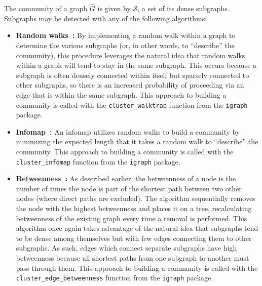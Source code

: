 The community of a graph $\hat{G}$ is given by $\mathcal{S}$, a set of its 
dense subgraphs. Subgraphs may be detected with any of the following algorithms:

\tablespacing
\begin{itemize}
	\item \textbf{Random walks~\cite{igraph}:} 
	By implementing a random walk within a graph 
	to determine the various subgraphs (or, in other words, to ``describe'' the 
	community), this procedure leverages the natural idea 
	that random walks within a graph will tend to stay in the same subgraph. 
	This occurs because a subgraph is often densely connected within itself but 
	sparsely connected to other subgraphs, so there is an increased probability 
	of proceeding via an edge that is within the same subgraph.
	This approach to building a community is called with the 
	\texttt{cluster\_walktrap} function from the \texttt{igraph} package.	
	
	\item \textbf{Infomap~\cite{igraph}:} 
	An infomap utilizes random walks to build a 
	community by minimizing the expected length that it takes a random walk 
	to ``describe'' the community.
	This approach to building a community is called with the 
	\texttt{cluster\_infomap} function from the \texttt{igraph} package.
	
	\item \textbf{Betweenness~\cite{igraph}:} 
	As described earlier, the betweenness of a node 
	is the number of times the node is part of the shortest path between two 
	other nodes (where direct paths are excluded). The algorithm sequentially 
	removes the node with the highest betweenness and places it on a tree, 
	recalculating betweenness of the existing graph every time a removal is 
	performed. This algorithm once again takes advantage of the natural idea 
	that subgraphs tend to be dense among themselves but with few edges 
	connecting them to other subgraphs. As such, edges which connect separate 
	subgraphs have high betweenness because all shortest paths from one 
	subgraph to another must pass through them. 
	This approach to building a community is called with the 
	\texttt{cluster\_edge\_betweenness} function from the \texttt{igraph} 
	package.
\end{itemize}
\bodyspacing

